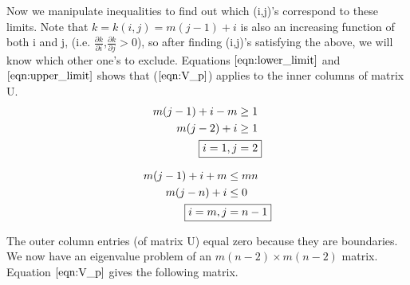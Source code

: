 \documentclass[letter]{article}
\begin{document}
	Now we manipulate inequalities to find out which (i,j)'s correspond to these limits.
	Note that $k = k(i,j) = m(j-1) + i$ is also an increasing function of both i and j, (i.e. $\frac{\partial k}{\partial i}$,$\frac{\partial k}{\partial j}>0$), so after finding (i,j)'s satisfying the above, we will know which other one's to exclude. Equations $\ref{eqn:lower_limit}$ and $\ref{eqn:upper_limit}$ shows that ($\ref{eqn:V_p}$) applies to the inner columns of matrix U. \\
	\begin{equation} \label{eqn:lower_limit}
		\begin{split}
		m(j-1) + i - m &\geq 1\\
		m(j-2) + i &\geq 1\\
		\Aboxed{i = 1, j &= 2}\\
		\end{split}
	\end{equation} 

	\begin{equation} \label{eqn:upper_limit}
		\begin{split}
		m(j-1) + i + m &\leq mn\\
		m(j -n) + i &\leq 0\\
		\Aboxed{i=m, j&=n-1}\\
		\end{split}
	\end{equation}
	
	The outer column entries (of matrix U) equal zero because they are boundaries. We now have an eigenvalue problem of an $m(n-2) \times m(n-2)$ matrix. Equation $\ref{eqn:V_p}$ gives the following matrix. \\
	
\end{document}

